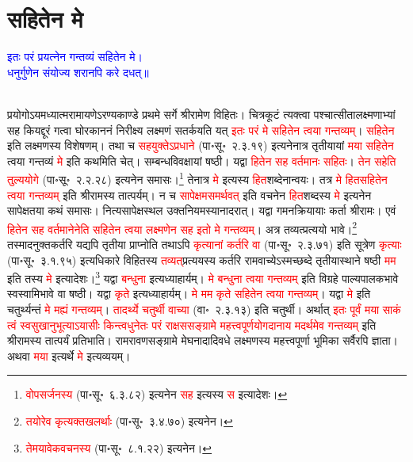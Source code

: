 \section[सहितेन मे]{सहितेन मे}
\centering\textcolor{blue}{इतः परं प्रयत्नेन गन्तव्यं सहितेन मे।\nopagebreak\\
धनुर्गुणेन संयोज्य शरानपि करे दधत्॥}\nopagebreak\\
\\
\begin{sloppypar}\justifying\noindent\hspace{10mm} प्रयोगोऽयमध्यात्म\-रामायणेऽरण्य\-काण्डे प्रथमे सर्गे श्रीरामेण विहितः। चित्रकूटं त्यक्त्वा पश्चात्सीता\-लक्ष्मणाभ्यां सह कियद्दूरं गत्वा घोर\-काननं निरीक्ष्य लक्ष्मणं सतर्कयति यत् \textcolor{red}{इतः परं मे सहितेन त्वया गन्तव्यम्‌}। \textcolor{red}{सहितेन} इति लक्ष्मणस्य विशेषणम्। तथा च \textcolor{red}{सह\-युक्तेऽप्रधाने} (पा॰सू॰~२.३.१९) इत्यनेनात्र तृतीयायां \textcolor{red}{मया सहितेन} त्वया गन्तव्यं \textcolor{red}{मे} इति कथमिति चेत्। सम्बन्ध\-विवक्षायां षष्ठी। यद्वा \textcolor{red}{हितेन सह वर्तमानः सहितः}। \textcolor{red}{तेन सहेति तुल्य\-योगे} (पा॰सू॰~२.२.२८) इत्यनेन समासः।\footnote{\textcolor{red}{वोपसर्जनस्य} (पा॰सू॰~६.३.८२) इत्यनेन \textcolor{red}{सह} इत्यस्य \textcolor{red}{स} इत्यादेशः।} तेनात्र \textcolor{red}{मे} इत्यस्य \textcolor{red}{हित}\-शब्देनान्वयः। तत्र \textcolor{red}{मे हित\-सहितेन त्वया गन्तव्यम्‌} इति श्रीरामस्य तात्पर्यम्। न च \textcolor{red}{सापेक्षमसमर्थवत्‌} इति वचनेन \textcolor{red}{हित}\-शब्दस्य \textcolor{red}{मे} इत्यनेन सापेक्षतया कथं समासः। नित्य\-सापेक्ष\-स्थल उक्त\-नियमस्यानादरात्। यद्वा गमन\-क्रियायाः कर्ता श्रीरामः। एवं \textcolor{red}{हितेन सह वर्तमानेनेति सहितेन त्वया लक्ष्मणेन सह इतो मे गन्तव्यम्‌}। अत्र तव्यत्प्रत्ययो भावे।\footnote{\textcolor{red}{तयोरेव कृत्य\-क्तखलर्थाः} (पा॰सू॰~३.४.७०) इत्यनेन।} तस्मादनुक्त\-कर्तरि यद्यपि तृतीया प्राप्नोति तथाऽपि \textcolor{red}{कृत्यानां कर्तरि वा} (पा॰सू॰~२.३.७१) इति सूत्रेण \textcolor{red}{कृत्याः} (पा॰सू॰~३.१.९५) इत्यधिकारे विहितस्य \textcolor{red}{तव्यत्‌}\-प्रत्ययस्य कर्तरि राम\-वाच्येऽस्मच्छब्दे तृतीया\-स्थाने षष्ठी \textcolor{red}{मम} इति तस्य \textcolor{red}{मे} इत्यादेशः।\footnote{\textcolor{red}{तेमयावेकवचनस्य} (पा॰सू॰~८.१.२२) इत्यनेन।} यद्वा \textcolor{red}{बन्धुना} इत्यध्याहार्यम्। \textcolor{red}{मे बन्धुना त्वया गन्तव्यम्‌} इति विग्रहे पाल्य\-पालक\-भावे स्व\-स्वामि\-भावे वा षष्ठी। यद्वा \textcolor{red}{कृते} इत्यध्याहार्यम्।
\textcolor{red}{मे मम कृते सहितेन त्वया गन्तव्यम्‌}। यद्वा \textcolor{red}{मे} इति चतुर्थ्यन्तं \textcolor{red}{मे मह्यं गन्तव्यम्‌}। \textcolor{red}{तादर्थ्ये चतुर्थी वाच्या} (वा॰~२.३.१३) इति चतुर्थी। अर्थात् \textcolor{red}{इतः पूर्वं मया साकं त्वं स्व\-सुखानुभूत्याऽयासीः किन्त्वधुनेतः परं राक्षस\-सङ्ग्रामे महत्त्व\-पूर्ण\-योग\-दानाय मदर्थमेव गन्तव्यम्‌} इति श्रीरामस्य तात्पर्यं प्रतिभाति। राम\-रावण\-सङ्ग्रामे मेघनादादि\-वधे लक्ष्मणस्य महत्त्व\-पूर्णा भूमिका सर्वैरपि ज्ञाता। 
अथवा \textcolor{red}{मया} इत्यर्थे \textcolor{red}{मे} इत्यव्ययम्।\end{sloppypar}
